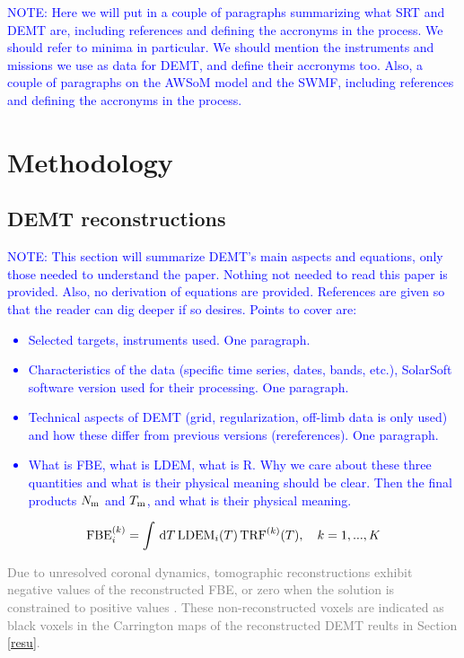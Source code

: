 \documentclass[namedreferences]{solarphysics}
\newcommand{\LDEM}{{\rm LDEM}}
\newcommand{\FBE}{{\rm FBE}}
\newcommand{\TRF}{{\rm TRF}}
\newcommand{\Tm}{T_{\rm m}}
\newcommand{\Nm}{N_{\rm m}}
\def\temp#1{\textcolor{gray}{#1}}
\def\notebyalbert#1{\textcolor{blue}{NOTE: #1}}
\begin{document}
\begin{article}
\noindent\notebyalbert{Here we will put in a couple of paragraphs summarizing what SRT and DEMT are, including references and defining the accronyms in the process. We should refer to minima in particular. We should mention the instruments and missions we use as data for DEMT, and define their accronyms too. Also, a couple of paragraphs on the AWSoM model and the SWMF, including references and defining the accronyms in the process.}

\section{Methodology}\label{meto}   

\subsection{DEMT reconstructions}\label{demt}

\noindent\notebyalbert{This section will summarize DEMT's main aspects and equations, only those needed to understand the paper. Nothing not needed to read this paper is provided. Also, no derivation of equations are provided. References are given so that the reader can dig deeper if so desires. Points to cover are:
\begin{itemize}
  \item Selected targets, instruments used. One paragraph.
  \item Characteristics of the data (specific time series, dates, bands, etc.), SolarSoft software version used for their processing. One paragraph.
  \item Technical aspects of DEMT (grid, regularization, off-limb data is only used) and how these differ from previous versions (rereferences). One paragraph.
  \item What is FBE, what is LDEM, what is R. Why we care about these three quantities and what is their physical meaning should be clear. Then the final products $\Nm$ and $\Tm$, and what is their physical meaning.
\end{itemize}
}

\begin{equation}\label{fbeldem}
\FBE_i^{(k)}  = \int\,\textrm{d}T\,\LDEM_i(T)\,{\TRF}^{(k)}(T), \ \ \ {k=1,...,K}
\end{equation}

\temp{
Due to unresolved coronal dynamics, tomographic reconstructions exhibit negative values of the reconstructed FBE, or zero when the solution is constrained to positive values \citep{frazin_2000,frazin_2009}. These non-reconstructed voxels are indicated as black voxels in the Carrington maps of the reconstructed DEMT reults in Section \ref{resu}.
}


\end{article}
\end{document}
